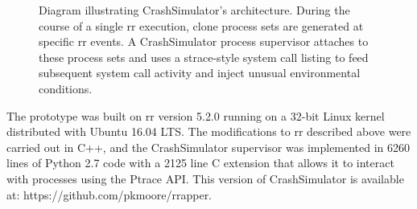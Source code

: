 \begin{figure}[t]
  \center{}
  \caption{Diagram illustrating CrashSimulator's architecture.  During the
    course of a single rr execution, clone process sets are generated at
    specific rr events.  A CrashSimulator process supervisor attaches to
    these process sets and uses a strace-style system call listing to feed
    subsequent system call activity and inject unusual environmental
    conditions.}
  \label{figure:architecture}
\end{figure}

The prototype was built on rr version 5.2.0 running on a 32-bit Linux kernel
distributed with Ubuntu 16.04 LTS.  The modifications to rr described above
were carried out in C++, and the CrashSimulator
supervisor was implemented in 6260 lines of Python 2.7 code with a 2125
line C extension that allows it to interact with processes using the Ptrace
API.
This version of CrashSimulator is available at:
https://github.com/pkmoore/rrapper.
